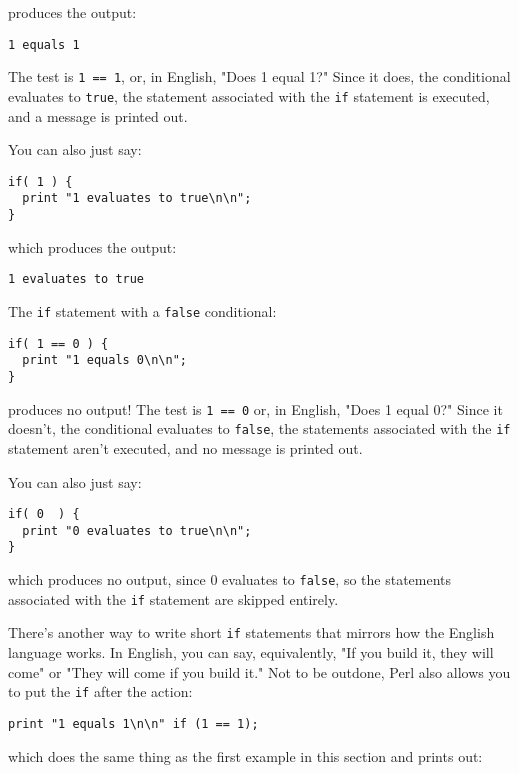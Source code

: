 produces the output:

\begin{lstlisting}
1 equals 1
\end{lstlisting}

The test is \verb|1 == 1|, or, in English, "Does 1 equal 1?" Since it does, the conditional evaluates to \verb|true|, the statement associated with the \verb|if| statement is executed, and a message is printed out.

You can also just say:

\begin{lstlisting}
if( 1 ) {
  print "1 evaluates to true\n\n";
}
\end{lstlisting}

which produces the output:

\begin{lstlisting}
1 evaluates to true
\end{lstlisting}

The \verb|if| statement with a \verb|false| conditional: 

\begin{lstlisting}
if( 1 == 0 ) {
  print "1 equals 0\n\n";
}
\end{lstlisting}

produces no output! The test is \verb|1 == 0| or, in English, "Does 1 equal 0?" Since it doesn't, the conditional evaluates to \verb|false|, the statements associated with the \verb|if| statement aren't executed, and no message is printed out.

You can also just say:

\begin{lstlisting}
if( 0  ) {
  print "0 evaluates to true\n\n";
}
\end{lstlisting}

which produces no output, since 0 evaluates to \verb|false|, so the statements associated with the \verb|if| statement are skipped entirely. 

There's another way to write short \verb|if| statements that mirrors how the English language works. In English, you can say, equivalently, "If you build it, they will come" or "They will come if you build it." Not to be outdone, Perl also allows you to put the \verb|if| after the action:

\begin{lstlisting}
print "1 equals 1\n\n" if (1 == 1);
\end{lstlisting}

which does the same thing as the first example in this section and prints out:

